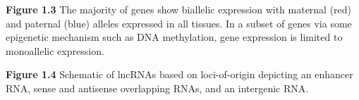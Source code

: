 \documentclass{beamer}
\begin{document}
\begin{frame}

  \begin{block}{\textbf{Figure 1.3}}
  The majority of genes show biallelic expression with maternal (red) and paternal (blue) alleles expressed in all tissues. In a subset of genes via some epigenetic mechanism such as DNA methylation, gene expression is limited to monoallelic expression.
  \end{block}
\end{frame}

\begin{frame}
  \begin{block}{\textbf{Figure 1.4}}
    Schematic of lncRNAs based on loci-of-origin depicting an enhancer RNA, sense and antisense overlapping RNAs, and an intergenic RNA.
  \end{block}
\end{frame}
\end{document}
